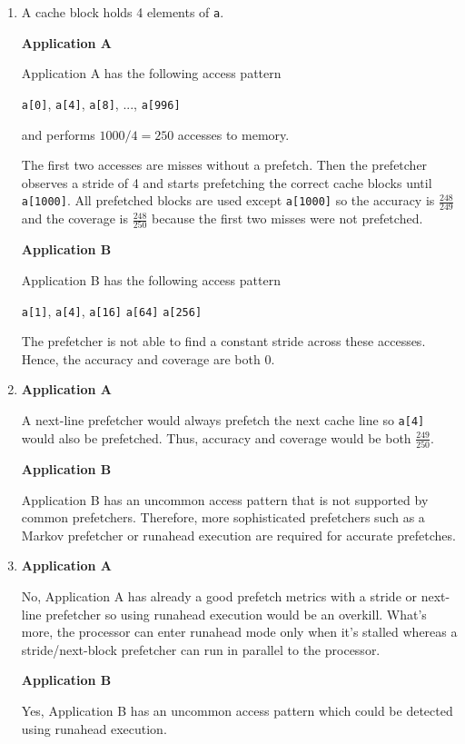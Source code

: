 \documentclass[a4paper]{article}
\begin{document}
\begin{enumerate}[label=\alph*)]
    \item A cache block holds 4 elements of \verb|a|.

        \textbf{Application A}

        Application A has the following access pattern

        \verb|a[0]|, \verb|a[4]|, \verb|a[8]|, ..., \verb|a[996]|

        and performs $1000/4 = 250$ accesses to memory.

        The first two accesses are misses without a prefetch. Then the
        prefetcher observes a stride of 4 and starts prefetching the correct
        cache blocks until \verb|a[1000]|. All prefetched blocks are used except
        \verb|a[1000]| so the accuracy is $\frac{248}{249}$ and the coverage is
        $\frac{248}{250}$ because the first two misses were not prefetched.

        \textbf{Application B}

        Application B has the following access pattern

        \verb|a[1]|, \verb|a[4]|, \verb|a[16]| \verb|a[64]| \verb|a[256]|

        The prefetcher is not able to find a constant stride across these
        accesses. Hence, the accuracy and coverage are both 0.

    \item
        \textbf{Application A}

        A next-line prefetcher would always prefetch the next cache line so
        \verb|a[4]| would also be prefetched. Thus, accuracy and coverage would
        be both $\frac{249}{250}$.

        \textbf{Application B}

        Application B has an uncommon access pattern that is not supported by
        common prefetchers. Therefore, more sophisticated prefetchers such as
        a Markov prefetcher or runahead execution are required for accurate
        prefetches.

    \item

        \textbf{Application A}

        No, Application A has already a good prefetch metrics with a stride or
        next-line prefetcher so using runahead execution would be an overkill.
        What's more, the processor can enter runahead mode only when it's
        stalled whereas a stride/next-block prefetcher can run in parallel to
        the processor.

        \textbf{Application B}

        Yes, Application B has an uncommon access pattern which could be
        detected using runahead execution.
\end{enumerate}
\end{document}
